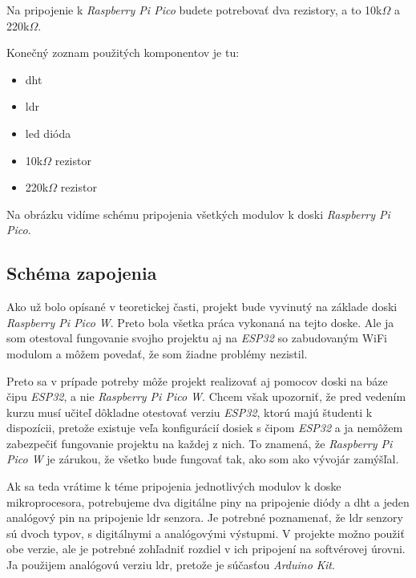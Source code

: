 Na pripojenie k \textit{Raspberry Pi Pico} budete potrebovať dva rezistory,
a to 10k$\Omega$
  a 220k$\Omega$.

  Konečný zoznam použitých komponentov je tu:
\begin{itemize}
    \item \gls{dht} 
    \item \gls{ldr}
    \item \gls{led} dióda
    \item 10k$\Omega$ rezistor
    \item 220k$
    \Omega$ rezistor
\end{itemize}
Na obrázku \label{schema} vidíme schému pripojenia všetkých modulov k doski \textit{Raspberry Pi Pico}. 

\subsection{Schéma zapojenia}
Ako už bolo opísané v teoretickej časti, projekt bude vyvinutý na základe doski \textit{Raspberry Pi Pico W}. Preto bola všetka práca vykonaná na tejto doske. Ale ja som otestoval fungovanie svojho projektu aj na \textit{ESP32} so zabudovaným WiFi modulom a môžem povedať, že som žiadne problémy nezistil. 

Preto sa v prípade potreby môže projekt realizovať aj pomocov doski na báze čipu \textit{ESP32}, a nie \textit{Raspberry Pi Pico W}. Chcem však upozorniť, že pred vedením kurzu musí učiteľ dôkladne otestovať verziu \textit{ESP32}, ktorú majú študenti k dispozícii, pretože existuje veľa konfigurácií dosiek s čipom \textit{ESP32} a ja nemôžem zabezpečiť fungovanie projektu na každej z nich. To znamená, že \textit{Raspberry Pi Pico W} je zárukou, že všetko bude fungovať tak, ako som ako vývojár zamýšľal. 

Ak sa teda vrátime k téme pripojenia jednotlivých modulov k doske mikroprocesora, potrebujeme dva digitálne piny na pripojenie diódy a \gls{dht} a jeden analógový pin na pripojenie \gls{ldr} senzora. Je potrebné poznamenať, že \gls{ldr} senzory sú dvoch typov, s digitálnymi a analógovými výstupmi. V projekte možno použiť obe verzie, ale je potrebné zohľadniť rozdiel v ich pripojení na softvérovej úrovni. Ja použijem analógovú verziu \gls{ldr}, pretože je súčasťou \textit{Arduino Kit}.

